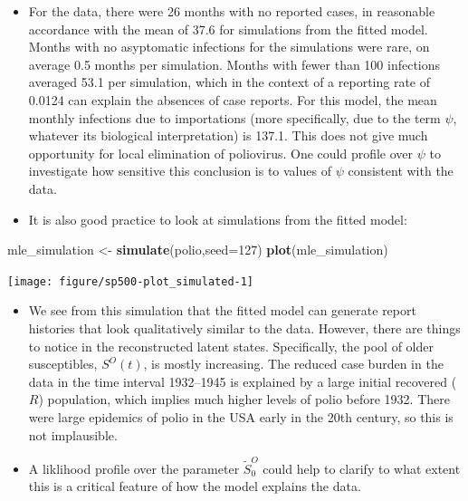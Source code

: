 \documentclass[]{article}
\newenvironment{Shaded}{\begin{snugshade}}{\end{snugshade}}
\newcommand{\KeywordTok}[1]{\textcolor[rgb]{0.13,0.29,0.53}{\textbf{#1}}}
\newcommand{\DataTypeTok}[1]{\textcolor[rgb]{0.13,0.29,0.53}{#1}}
\newcommand{\DecValTok}[1]{\textcolor[rgb]{0.00,0.00,0.81}{#1}}
\newcommand{\StringTok}[1]{\textcolor[rgb]{0.31,0.60,0.02}{#1}}
\newcommand{\NormalTok}[1]{#1}
\begin{document}
\begin{itemize}
\item
  For the data, there were 26 months with no reported cases, in
  reasonable accordance with the mean of 37.6 for simulations from the
  fitted model. Months with no asyptomatic infections for the
  simulations were rare, on average 0.5 months per simulation. Months
  with fewer than 100 infections averaged 53.1 per simulation, which in
  the context of a reporting rate of 0.0124 can explain the absences of
  case reports. For this model, the mean monthly infections due to
  importations (more specifically, due to the term \(\psi\), whatever
  its biological interpretation) is 137.1. This does not give much
  opportunity for local elimination of poliovirus. One could profile
  over \(\psi\) to investigate how sensitive this conclusion is to
  values of \(\psi\) consistent with the data.
\item
  It is also good practice to look at simulations from the fitted model:
\end{itemize}

\begin{Shaded}
\begin{Highlighting}[]
\NormalTok{mle_simulation <-}\StringTok{ }\KeywordTok{simulate}\NormalTok{(polio,}\DataTypeTok{seed=}\DecValTok{127}\NormalTok{)}
\KeywordTok{plot}\NormalTok{(mle_simulation)}
\end{Highlighting}
\end{Shaded}

\begin{center}\texttt{[image: figure/sp500-plot\_simulated-1]} \end{center}

\begin{itemize}
\item
  We see from this simulation that the fitted model can generate report
  histories that look qualitatively similar to the data. However, there
  are things to notice in the reconstructed latent states. Specifically,
  the pool of older susceptibles, \(S^O(t)\), is mostly increasing. The
  reduced case burden in the data in the time interval 1932--1945 is
  explained by a large initial recovered (\(R\)) population, which
  implies much higher levels of polio before 1932. There were large
  epidemics of polio in the USA early in the 20th century, so this is
  not implausible.
\item
  A liklihood profile over the parameter \(\tilde S^O_0\) could help to
  clarify to what extent this is a critical feature of how the model
  explains the data.
\end{itemize}
\end{document}
